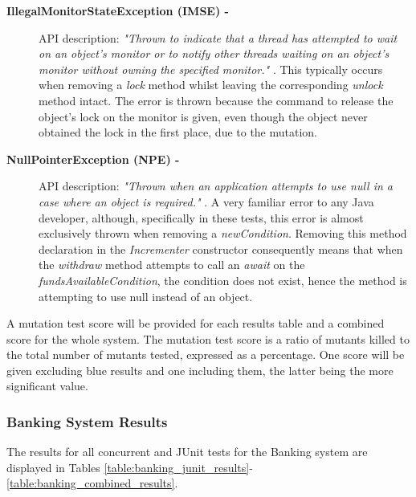 \documentclass[a4paper,12pt]{article}
\begin{document}
\begin{description}
    \item[\textbf{IllegalMonitorStateException (IMSE) -}]API description: \textit{"Thrown to indicate that a thread has attempted to wait on an object's monitor or to notify other threads waiting on an object's monitor without owning the specified monitor."} \citep{imse18}. This typically occurs when removing a \textit{lock} method whilst leaving the corresponding \textit{unlock} method intact. The error is thrown because the command to release the object's lock on the monitor is given, even though the object never obtained the lock in the first place, due to the mutation. 

    \item[\textbf{NullPointerException (NPE) - }] API description: \textit{"Thrown when an application attempts to use null in a case where an object is required."} \citep{npe18}. A very familiar error to any Java developer, although, specifically in these tests, this error is almost exclusively thrown when removing a \textit{newCondition}. Removing this method declaration in the \textit{Incrementer} constructor consequently means that when the \textit{withdraw} method attempts to call an \textit{await} on the \textit{fundsAvailableCondition}, the condition does not exist, hence the method is attempting to use null instead of an object.  
\end{description}

A mutation test score will be provided for each results table and a combined score for the whole system. The mutation test score is a ratio of mutants killed to the total number of mutants tested, expressed as a percentage. One score will be given excluding blue results and one including them, the latter being the more significant value. 

\subsubsection{Banking System Results} \label{section:Banking System Results}

The results for all concurrent and JUnit tests for the Banking system are displayed in Tables \ref{table:banking_junit_results}-\ref{table:banking_combined_results}. 
\end{document}
